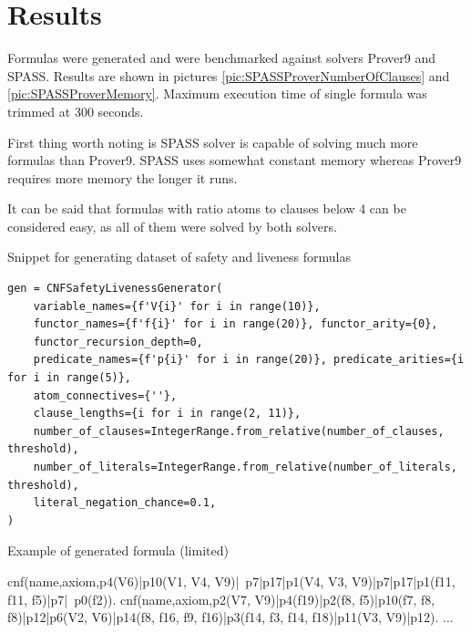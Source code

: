\section{Results}

Formulas were generated and were benchmarked against solvers Prover9 and SPASS. Results are shown in pictures \ref{pic:SPASSProverNumberOfClauses} and \ref{pic:SPASSProverMemory}. Maximum execution time of single formula was trimmed at 300 seconds. 

First thing worth noting is SPASS solver is capable of solving much more formulas than Prover9. SPASS uses somewhat constant memory whereas Prover9 requires more memory the longer it runs.

It can be said that formulas with ratio atoms to clauses below 4 can be considered easy, as all of them were solved by both solvers.

\begin{listing}[ht]
  \caption{Snippet for generating dataset of safety and liveness formulas}
  \label{lis:CNFSafetyLivenesSnippet}
\begin{verbatim}
gen = CNFSafetyLivenessGenerator(
    variable_names={f'V{i}' for i in range(10)},
    functor_names={f'f{i}' for i in range(20)}, functor_arity={0},
    functor_recursion_depth=0,
    predicate_names={f'p{i}' for i in range(20)}, predicate_arities={i for i in range(5)},
    atom_connectives={''},
    clause_lengths={i for i in range(2, 11)},
    number_of_clauses=IntegerRange.from_relative(number_of_clauses, threshold),
    number_of_literals=IntegerRange.from_relative(number_of_literals, threshold),
    literal_negation_chance=0.1,
)
\end{verbatim}
\end{listing}

\begin{listing}[ht]
  \caption{Example of generated formula (limited)}
\begin{tptpcode}
% 
cnf(name,axiom,p4(V6)|p10(V1, V4, V9)|~p7|p17|p1(V4, V3, V9)|p7|p17|p1(f11, f11, f5)|p7|~p0(f2)).
cnf(name,axiom,p2(V7, V9)|p4(f19)|p2(f8, f5)|p10(f7, f8, f8)|p12|p6(V2, V6)|p14(f8, f16, f9, f16)|p3(f14, f3, f14, f18)|p11(V3, V9)|p12).
...
\end{tptpcode}
  \label{lis:TPTPExample}
\end{listing}

